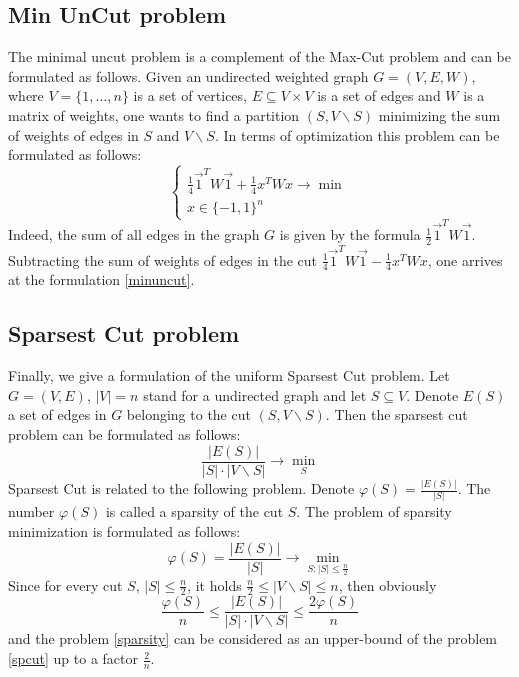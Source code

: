 \documentclass[12pt]{article}
\begin{document}
\subsection{Min UnCut problem}

The minimal uncut problem is a complement of the Max-Cut problem and can be 
formulated as follows.
Given an undirected weighted graph $G = (V, E, W)$, where $V = \{1, \dots, n\}$ is a set 
of vertices, $E \subseteq V \times V$ is a set of edges and $W$ is a matrix of weights, 
one wants to find a partition $(S, V\backslash S)$ minimizing the sum of weights of 
edges in $S$ and $V \backslash S$.
In terms of optimization this problem can be formulated as follows:
\begin{equation}
\label{minuncut}
	\begin{cases}
		\frac14 \vec 1^T W \vec 1 + \frac14 x^T W x \longrightarrow \min \\
		x \in \{-1, 1\}^n
	\end{cases}
\end{equation}
Indeed, the sum of all edges in the graph $G$ is given by the formula $\frac12 \vec 1^T W 
\vec 1$. Subtracting the sum of weights of edges in the cut $\frac14 \vec 1^T W \vec 1 - 
\frac14 x^T W x$, one arrives at the formulation \ref{minuncut}.



\subsection{Sparsest Cut problem}

Finally, we give a formulation of the uniform Sparsest Cut problem.
Let $G = (V, E)$, $|V| = n$ stand for a undirected graph and let $S \subseteq V$.
Denote $E(S)$ a set of edges in $G$ belonging to the cut $(S, V \backslash S)$.
Then the sparsest cut problem can be formulated as follows:
\begin{equation}
\label{spcut}
	\frac{ |E(S)| }{ |S| \cdot |V \backslash S| } \rightarrow \min\limits_S
\end{equation}
Sparsest Cut is related to the following problem.
Denote $\varphi(S) = \frac{ |E(S)| }{ |S| }$.
The number $\varphi(S)$ is called a sparsity of the cut $S$.
The problem of sparsity minimization is formulated as follows:
\begin{equation}
\label{sparsity}
	\varphi(S) = \frac{ |E(S)| }{ |S| } \longrightarrow \min\limits_{S : |S| \leq \frac n2}
\end{equation}
Since for every cut $S$, $|S| \leq \frac n2$, it holds	$\frac n2 \leq | V \backslash S| \leq 
n$, then obviously
\begin{equation}
\label{0}
	 \frac{ \varphi(S) }n \leq \frac{ |E(S)| }{ |S| \cdot |V \backslash S| } \leq  \frac{ 
	 2\varphi(S) }n
\end{equation}
and the problem \ref{sparsity} can be considered as an upper-bound of the problem 
\ref{spcut} up to a factor $\frac 2n$.
\end{document}
